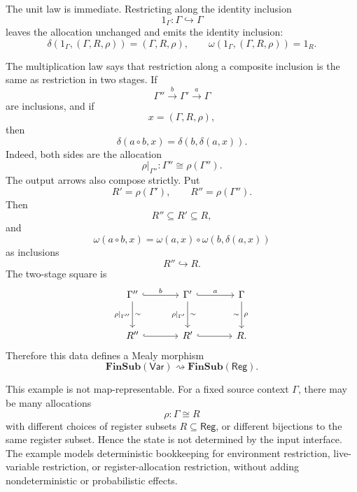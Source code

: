 \begin{example}
    The unit law is immediate. Restricting along the identity inclusion
    \[
        1_\Gamma:\Gamma\hookrightarrow \Gamma
    \]
    leaves the allocation unchanged and emits the identity inclusion:
    \[
        \delta(1_\Gamma,(\Gamma,R,\rho))=(\Gamma,R,\rho),
        \qquad
        \omega(1_\Gamma,(\Gamma,R,\rho))=1_R.
    \]
    
    The multiplication law says that restriction along a composite inclusion is the same as restriction in two stages. If
    \[
        \Gamma''
            \xrightarrow{b}
        \Gamma'
            \xrightarrow{a}
        \Gamma
    \]
    are inclusions, and if
    \[
        x=(\Gamma,R,\rho),
    \]
    then
    \[
        \delta(a\circ b,x)
        =
        \delta(b,\delta(a,x)).
    \]
    Indeed, both sides are the allocation
    \[
        \rho|_{\Gamma''}:\Gamma''\cong \rho(\Gamma'').
    \]
    The output arrows also compose strictly. Put
    \[
        R'=\rho(\Gamma'),
        \qquad
        R''=\rho(\Gamma'').
    \]
    Then
    \[
        R''\subseteq R'\subseteq R,
    \]
    and
    \[
        \omega(a\circ b,x)
        =
        \omega(a,x)\circ \omega(b,\delta(a,x))
    \]
    as inclusions
    \[
        R''\hookrightarrow R.
    \]
    The two-stage square is
    \[
        \begin{tikzcd}[column sep=large, row sep=large]
                \Gamma''
                    \arrow[r, hook, "{b}"]
                    \arrow[d, "{\rho|_{\Gamma''}}"', "\sim"]
            &
                \Gamma'
                    \arrow[r, hook, "{a}"]
                    \arrow[d, "{\rho|_{\Gamma'}}"', "\sim"]
            &
                \Gamma
                    \arrow[d, "{\rho}", "\sim"']
            \\
                R''
                    \arrow[r, hook]
            &
                R'
                    \arrow[r, hook]
            &
                R.
        \end{tikzcd}
    \]
    Therefore this data defines a Mealy morphism
    \[
        \mathbf{FinSub}(\mathsf{Var})
        \rightsquigarrow
        \mathbf{FinSub}(\mathsf{Reg}).
    \]
    
    This example is not map-representable. For a fixed source context \(\Gamma\), there may be many allocations
    \[
        \rho:\Gamma\cong R
    \]
    with different choices of register subsets \(R\subseteq\mathsf{Reg}\), or different bijections to the same register subset. Hence the state is not determined by the input interface. The example models deterministic bookkeeping for environment restriction, live-variable restriction, or register-allocation restriction, without adding nondeterministic or probabilistic effects.
\end{example}

